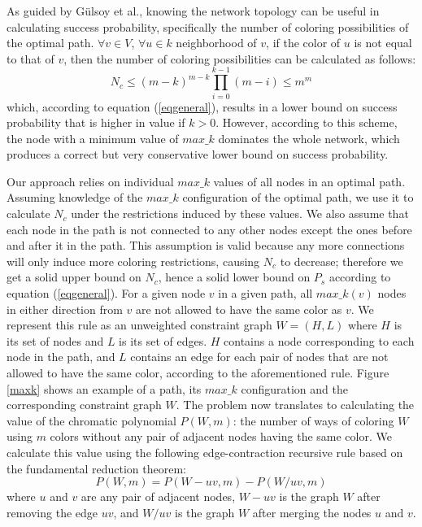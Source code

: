 \documentclass{ws-procs11x85}
\begin{document}
As guided by G{\"u}lsoy et al.\cite{gulsoy}, knowing the network topology can be
useful in calculating success probability, specifically the number of coloring
possibilities of the optimal path. $\forall v \in V$, $\forall u \in k$
neighborhood of $v$, if the color of $u$ is not equal to that of $v$, then the
number of coloring possibilities can be calculated as follows:
\begin{equation}
N_c \leq (m - k)^{m - k} \prod_{i=0}^{k-1} (m - i)  \leq  m^m
\end{equation}
which, according to equation (\ref{eqgeneral}), results in a lower bound on success
probability that is higher in value if $k > 0$. However, according to this
scheme, the node with a minimum value of $max\_k$ dominates the whole network,
which produces a correct but very conservative lower bound on success
probability.

Our approach relies on individual $max\_k$ values of all nodes in an optimal
path. Assuming knowledge of the $max\_k$ configuration of the optimal path, we
use it to calculate $N_c$ under the restrictions induced by these values. We
also assume that each node in the path is not connected to any other nodes
except the ones before and after it in the path. This assumption is valid
because any more connections will only induce more coloring restrictions,
causing $N_c$ to decrease; therefore we get a solid upper bound on $N_c$, hence
a solid lower bound on $P_s$ according to equation (\ref{eqgeneral}). For a given node
$v$ in a given path, all $max\_k(v)$ nodes in either direction from $v$ are not allowed to have the same
color as $v$. We represent this rule as an unweighted constraint graph $W = (H,
L)$ where $H$ is its set of nodes and $L$ is its set of edges. $H$ contains a
node corresponding to each node in the path, and $L$ contains an edge for each
pair of nodes that are not allowed to have the same color, according to the
aforementioned rule. Figure \ref{maxk} shows an example of a path, its $max\_k$
configuration and the corresponding constraint graph $W$. The problem now
translates to calculating the value of the chromatic polynomial $P(W, m)$: the
number of ways of coloring $W$ using $m$ colors without any pair of adjacent
nodes having the same color. We calculate this value using the following
edge-contraction recursive rule based on the fundamental reduction
theorem\cite{dong}:
\begin{equation}
P(W, m) = P(W - uv, m) - P(W / uv, m)
\label{eqchromatic}
\end{equation}
where $u$ and $v$ are any pair of adjacent nodes, $W - uv$ is the graph $W$
after removing the edge $uv$, and $W / uv$ is the graph $W$ after merging the
nodes $u$ and $v$.
\end{document}
